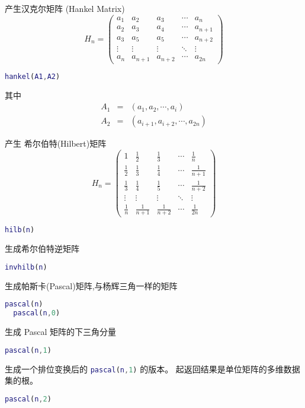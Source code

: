 \documentclass{ctexart}
\begin{document}
  产生汉克尔矩阵 (Hankel Matrix)
  $$H_n=\left(\begin{array}{ccccc}
  a_1    & a_2     & a_3      & \cdots & a_n     \\
  a_2    & a_3     & a_4      & \cdots & a_{n+1} \\
  a_3    & a_5     & a_5      & \cdots & a_{n+2} \\
  \vdots & \vdots  & \vdots   & \ddots & \vdots  \\
  a_n    & a_{n+1} & a_{n+2}  & \cdots & a_{2n}
  \end{array}\right)$$
  \begin{lstlisting}[language=matlab]
  hankel(A1,A2)
  \end{lstlisting}
  其中
  \begin{eqnarray*}
  A_1 &=& (a_1,a_2,\cdots,a_i) \\
  A_2 &=& (a_{i+1},a_{i+2},\cdots,a_{2n})
  \end{eqnarray*}

  产生 希尔伯特(Hilbert)矩阵
  $$H_n=\left(\begin{array}{ccccc}
  1           & \frac{1}{2}   & \frac{1}{3}   & \cdots & \frac{1}{n}   \\
  \frac{1}{2} & \frac{1}{3}   & \frac{1}{4}   & \cdots & \frac{1}{n+1} \\
  \frac{1}{3} & \frac{1}{4}   & \frac{1}{5}   & \cdots & \frac{1}{n+2} \\
  \vdots      & \vdots        & \vdots        & \ddots & \vdots        \\
  \frac{1}{n} & \frac{1}{n+1} & \frac{1}{n+2} & \cdots & \frac{1}{2n}
  \end{array}\right)$$
  \begin{lstlisting}[language=matlab]
  hilb(n)
  \end{lstlisting}

  生成希尔伯特逆矩阵
  \begin{lstlisting}[language=matlab]
  invhilb(n)
  \end{lstlisting}

  生成帕斯卡(Pascal)矩阵,与杨辉三角一样的矩阵
  \begin{lstlisting}[language=matlab]
  pascal(n)
  pascal(n,0)
  \end{lstlisting}
  生成 Pascal 矩阵的下三角分量
  \begin{lstlisting}[language=matlab]
  pascal(n,1)
  \end{lstlisting}
  生成一个排位变换后的 \lstinline[language=matlab]|pascal(n,1)| 的版本。
  起返回结果是单位矩阵的多维数据集的根。
  \begin{lstlisting}[language=matlab]
  pascal(n,2)
  \end{lstlisting}
  
\end{document}
